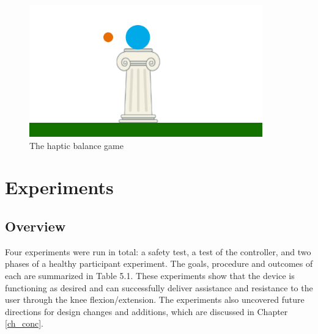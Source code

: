 \documentclass[12pt]{report}
\begin{document}
\begin{figure}[h] 
		\centering
		\includegraphics[width=0.75\linewidth]{balance_game}
		\caption{The haptic balance game}
		\label{fig:balance_game}
	\end{figure} 


\afterpage{\null\newpage}	
\chapter{Experiments}

	\section{Overview}
	
	Four experiments were run in total: a safety test, a test of the controller, and two phases of a healthy participant experiment. The goals, procedure and outcomes of each are summarized in Table 5.1. These experiments show that the device is functioning as desired and can successfully deliver assistance and resistance to the user through the knee flexion/extension. The experiments also uncovered future directions for design changes and additions, which are discussed in Chapter \ref{ch_conc}. 
	
\end{document}
